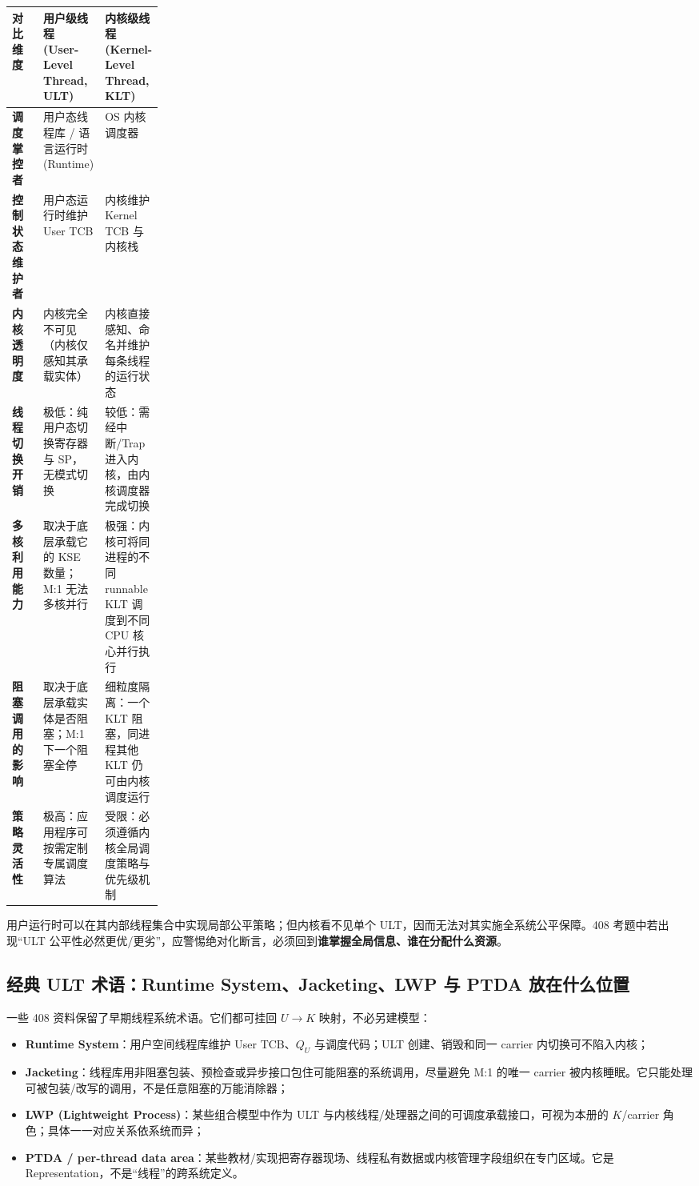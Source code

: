 \documentclass[11pt,a4paper]{ctexart}
\newcommand{\kw}[1]{\textbf{#1}}
\begin{document}
\begingroup
\small
\renewcommand{\arraystretch}{1.25}
\setlength{\tabcolsep}{5pt}
\begin{tabularx}{\linewidth}{>{\bfseries}p{0.22\linewidth} X X}
\toprule
对比维度 & 用户级线程 (User-Level Thread, ULT) & 内核级线程 (Kernel-Level Thread, KLT)\\
\midrule
调度掌控者 & 用户态线程库 / 语言运行时 (Runtime) & OS 内核调度器\\
控制状态维护者 & 用户态运行时维护 User TCB & 内核维护 Kernel TCB 与内核栈\\
内核透明度 & 内核完全不可见（内核仅感知其承载实体） & 内核直接感知、命名并维护每条线程的运行状态\\
线程切换开销 & 极低：纯用户态切换寄存器与 SP，无模式切换 & 较低：需经中断/Trap 进入内核，由内核调度器完成切换\\
多核利用能力 & 取决于底层承载它的 KSE 数量；M:1 无法多核并行 & 极强：内核可将同进程的不同 runnable KLT 调度到不同 CPU 核心并行执行\\
阻塞调用的影响 & 取决于底层承载实体是否阻塞；M:1 下一个阻塞全停 & 细粒度隔离：一个 KLT 阻塞，同进程其他 KLT 仍可由内核调度运行\\
策略灵活性 & 极高：应用程序可按需定制专属调度算法 & 受限：必须遵循内核全局调度策略与优先级机制\\
\bottomrule
\end{tabularx}
\endgroup

\begin{warn}
用户运行时可以在其内部线程集合中实现局部公平策略；但内核看不见单个 ULT，因而无法对其实施全系统公平保障。408 考题中若出现“ULT 公平性必然更优/更劣”，应警惕绝对化断言，必须回到\kw{谁掌握全局信息、谁在分配什么资源}。
\end{warn}

\subsection{经典 ULT 术语：Runtime System、Jacketing、LWP 与 PTDA 放在什么位置}

一些 408 资料保留了早期线程系统术语。它们都可挂回 $U\to K$ 映射，不必另建模型：
\begin{itemize}
\item \kw{Runtime System}：用户空间线程库维护 User TCB、$Q_U$ 与调度代码；ULT 创建、销毁和同一 carrier 内切换可不陷入内核；
\item \kw{Jacketing}：线程库用非阻塞包装、预检查或异步接口包住可能阻塞的系统调用，尽量避免 M:1 的唯一 carrier 被内核睡眠。它只能处理可被包装/改写的调用，不是任意阻塞的万能消除器；
\item \kw{LWP (Lightweight Process)}：某些组合模型中作为 ULT 与内核线程/处理器之间的可调度承载接口，可视为本册的 $K$/carrier 角色；具体一一对应关系依系统而异；
\item \kw{PTDA / per-thread data area}：某些教材/实现把寄存器现场、线程私有数据或内核管理字段组织在专门区域。它是 Representation，不是“线程”的跨系统定义。
\end{itemize}
\end{document}
